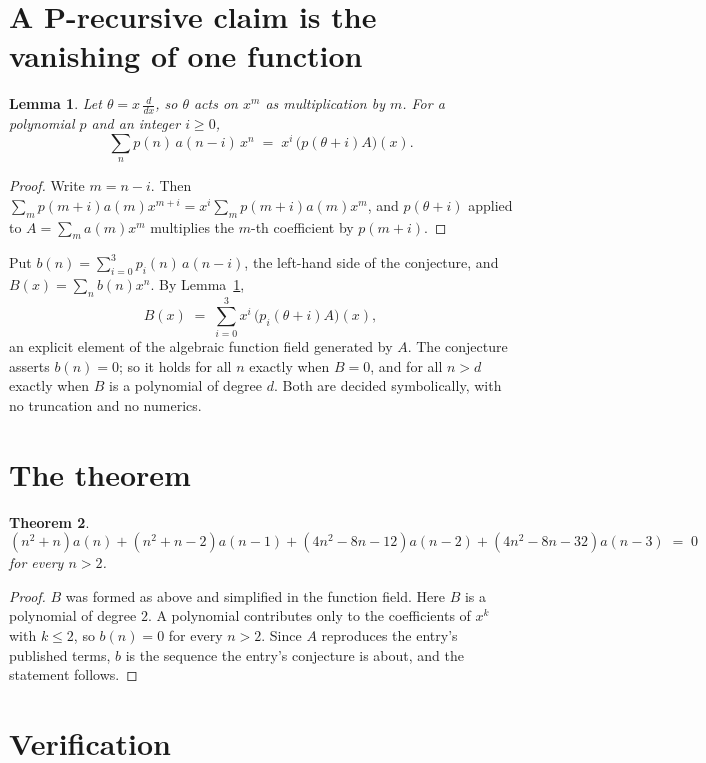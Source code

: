 \documentclass[11pt,a4paper]{article}
\theoremstyle{plain}
\newtheorem{theorem}{Theorem}
\newtheorem{lemma}[theorem]{Lemma}
\theoremstyle{definition}
\begin{document}
\section{A P-recursive claim is the vanishing of one function}

\begin{lemma}\label{lem:theta}
Let $\theta=x\,\frac{d}{dx}$, so $\theta$ acts on $x^m$ as multiplication by $m$. For a
polynomial $p$ and an integer $i\ge0$,
\[
\sum_{n} p(n)\,a(n-i)\,x^{n}\;=\;x^{i}\,\bigl(p(\theta+i)A\bigr)(x).
\]
\end{lemma}

\begin{proof}
Write $m=n-i$. Then $\sum_m p(m+i)a(m)x^{m+i}=x^i\sum_m p(m+i)a(m)x^m$, and $p(\theta+i)$
applied to $A=\sum_m a(m)x^m$ multiplies the $m$-th coefficient by $p(m+i)$.
\end{proof}

Put $b(n)=\sum_{i=0}^{3}p_i(n)\,a(n-i)$, the left-hand side of the conjecture, and
$B(x)=\sum_n b(n)x^n$. By Lemma~\ref{lem:theta},
\[
B(x)\;=\;\sum_{i=0}^{3}x^{i}\,\bigl(p_i(\theta+i)A\bigr)(x),
\]
an explicit element of the algebraic function field generated by $A$. The conjecture asserts
$b(n)=0$; so it holds for all $n$ exactly when $B=0$, and for all $n>d$ exactly when $B$ is a
polynomial of degree $d$. Both are decided symbolically, with no truncation and no numerics.

\section{The theorem}

\begin{theorem}
\[
\left(n^{2} + n\right)a(n) + \left(n^{2} + n - 2\right)a(n-1) + \left(4 n^{2} - 8 n - 12\right)a(n-2) + \left(4 n^{2} - 8 n - 32\right)a(n-3)\;=\;0
\]
for every $n>2$.
\end{theorem}

\begin{proof}
$B$ was formed as above and simplified in the function field. Here $B$ is a polynomial of degree $2$. A polynomial contributes only to the coefficients of $x^k$ with $k\le2$, so $b(n)=0$ for every $n>2$. Since $A$ reproduces the
entry's published terms, $b$ is the sequence the entry's conjecture is about, and the statement
follows.
\end{proof}

\section{Verification}
\end{document}
